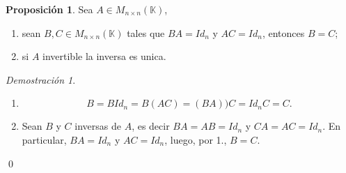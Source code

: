 \documentclass{article}
\theoremstyle{definition}
\theoremstyle{definition}
\newtheorem{prop}[teo]{Proposición}
\theoremstyle{remark}
\newtheorem*{demo}{Demostración}
\begin{document}
\begin{prop}
  Sea $A \in M_{n \times n} (\mathbb{K})$, \begin{enumerate}[label=\textcolor{azulp2}{(\arabic*)}]
    \item sean $B,C \in M_{n \times n}(\mathbb{K})$ tales que $BA=Id_n$ y $AC=Id_n$, entonces $B=C$;
    \item si $A$ invertible la inversa es unica.
 \end{enumerate}
\end{prop}
\begin{demo}\;
  \begin{enumerate}[label=\textcolor{azulp2}{\arabic*.}]
    \item \[
        B=BId_n=B(AC)=(BA))C=Id_nC=C.
      \]
    \item Sean $B$ y $C$ inversas de $A$, es decir $BA=AB=Id_n$ y $CA=AC=Id_n$. En particular, $BA=Id_n$ y $AC=Id_n$, luego, por \textcolor{azulp2}{1.}, $B=C$. 
 \end{enumerate}\qed
\end{demo}
\pagebreak
\end{document}
